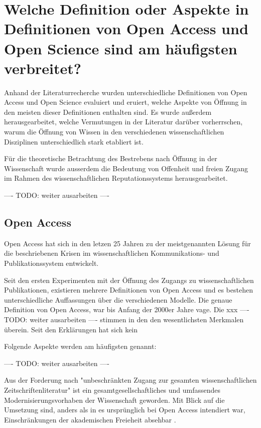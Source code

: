 \section{Welche Definition oder Aspekte in Definitionen von Open Access und Open Science sind am häufigsten verbreitet?}

Anhand der Literaturrecherche wurden unterschiedliche Definitionen von Open Access und Open Science evaluiert und eruiert, welche Aspekte von Öffnung in den meisten dieser Definitionen enthalten sind. Es wurde außerdem herausgearbeitet, welche Vermutungen in der Literatur darüber vorherrschen, warum die Öffnung von Wissen in den verschiedenen wissenschaftlichen Disziplinen unterschiedlich stark etabliert ist.

Für die theoretische Betrachtung des Bestrebens nach Öffnung in der Wissenschaft wurde ausserdem die Bedeutung von Offenheit und freien Zugang im Rahmen des wissenschaftlichen Reputationssystems herausgearbeitet.

---- TODO: weiter ausarbeiten ----

\subsection{Open Access}

Open Access hat sich in den letzen 25 Jahren zu der meistgenannten Lösung für die beschriebenen Krisen im wissenschaftlichen Kommunikations- und Publikationssystem entwickelt.

Seit den ersten Experimenten mit der Öffnung des Zugangs zu wissenschaftlichen Publikationen,  existieren mehrere Definitionen von Open Access und es bestehen unterschiedliche Auffassungen über die verschiedenen Modelle. Die genaue Definition von Open Access, war bis Anfang der 2000er Jahre vage. Die xxx ---- TODO: weiter ausarbeiten ---- stimmen in den den wesentlichsten Merkmalen überein\cite{albert_2006_open_implications}. Seit den Erklärungen hat sich kein

Folgende Aspekte werden am häufigsten genannt:

---- TODO: weiter ausarbeiten ----

Aus der Forderung nach "unbeschränkten Zugang zur gesamten wissenschaftlichen Zeitschriftenliteratur" ist ein gesamtgesellschaftliches und umfassendes Modernisierungsvorhaben der Wissenschaft geworden. Mit Blick auf die Umsetzung sind, anders als in es ursprünglich bei Open Access intendiert war, Einschränkungen der akademischen Freieheit absehbar \cite{hagner_2015_sache_buches}.

